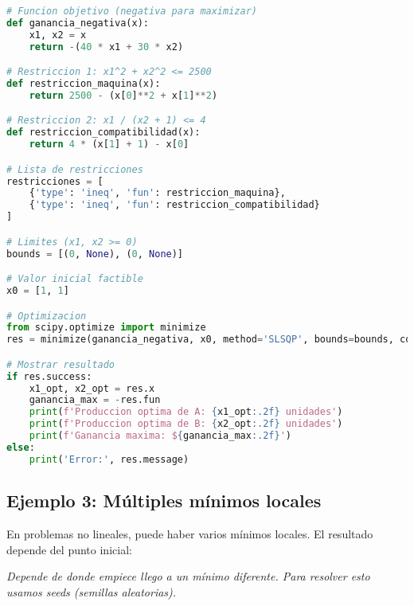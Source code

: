\documentclass[12pt]{article}
\begin{document}
\begin{lstlisting}[language=Python]
# Funcion objetivo (negativa para maximizar)
def ganancia_negativa(x):
    x1, x2 = x
    return -(40 * x1 + 30 * x2)

# Restriccion 1: x1^2 + x2^2 <= 2500
def restriccion_maquina(x):
    return 2500 - (x[0]**2 + x[1]**2)

# Restriccion 2: x1 / (x2 + 1) <= 4
def restriccion_compatibilidad(x):
    return 4 * (x[1] + 1) - x[0]

# Lista de restricciones
restricciones = [
    {'type': 'ineq', 'fun': restriccion_maquina},
    {'type': 'ineq', 'fun': restriccion_compatibilidad}
]

# Limites (x1, x2 >= 0)
bounds = [(0, None), (0, None)]

# Valor inicial factible
x0 = [1, 1]

# Optimizacion
from scipy.optimize import minimize
res = minimize(ganancia_negativa, x0, method='SLSQP', bounds=bounds, constraints=restricciones)

# Mostrar resultado
if res.success:
    x1_opt, x2_opt = res.x
    ganancia_max = -res.fun
    print(f'Produccion optima de A: {x1_opt:.2f} unidades')
    print(f'Produccion optima de B: {x2_opt:.2f} unidades')
    print(f'Ganancia maxima: ${ganancia_max:.2f}')
else:
    print('Error:', res.message)
\end{lstlisting}

\vspace{1em}

\subsection{Ejemplo 3: Múltiples mínimos locales}

En problemas no lineales, puede haber varios mínimos locales. El resultado depende del punto inicial:

\begin{center}
\end{center}

\noindent
\textit{Depende de donde empiece llego a un mínimo diferente. Para resolver esto usamos seeds (semillas aleatorias).}
\end{document}
